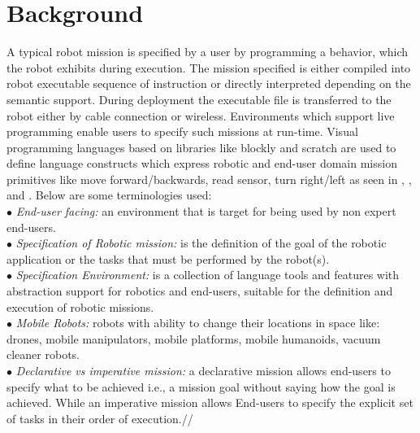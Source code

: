 \section{Background}
A typical robot mission is specified by a user by programming a behavior, which the robot exhibits during execution. The mission specified is either compiled into robot executable sequence of instruction or directly interpreted depending on the semantic support. During deployment the executable file is transferred to the robot either by cable connection or wireless. Environments which support live programming enable users to specify such missions at run-time. Visual programming languages based on libraries like blockly \cite{blockly} and scratch are used to define language constructs which express robotic and end-user domain mission primitives like move forward/backwards, read sensor, turn right/left as seen in \openroberta, \picaxe, \edison and \sphero. Below are some terminologies used:\\%
$\bullet$ \emph{End-user facing:} an environment that is target for being used by non expert end-users.\\ %
$\bullet$ \emph{Specification of Robotic mission:} is the definition of the goal of the robotic application or the tasks that must be performed by the robot(s). \\
$\bullet$ \emph{Specification  Environment:} is a collection of language tools and features with abstraction support for robotics and end-users, suitable for the definition and execution of robotic missions.\\
$\bullet$ \emph{Mobile Robots:} robots with ability to change  their locations in space like: drones, mobile manipulators, mobile platforms, mobile humanoids, vacuum cleaner robots.\\
$\bullet$ \emph{Declarative vs imperative mission:} a declarative mission allows end-users to specify what to be achieved i.e., a mission goal without saying how the goal is achieved. While an  imperative mission allows End-users to specify the explicit set of tasks in their order of execution.// %
